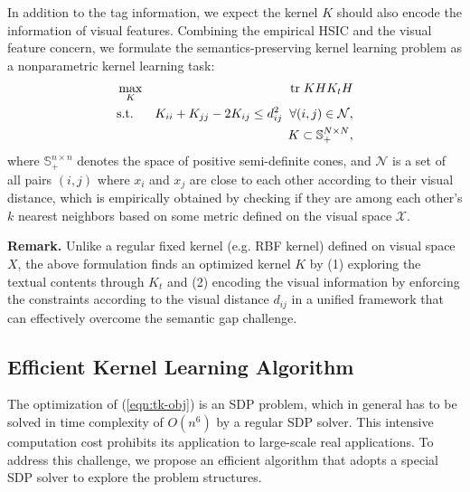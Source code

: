 In addition to the tag information, we expect the kernel $K$ should also encode the information of visual features. Combining the empirical HSIC and the visual feature concern, we formulate the semantics-preserving kernel learning problem as a nonparametric kernel learning task:
\begin{eqnarray} \label{eqn:tk-obj}
&\max_{K}& \tr K H K_t H\\
&\mbox{s.t.}& K_{ii} + K_{jj} - 2K_{ij} \leq d^2_{ij}\;\;\forall (i, j) \in \mathcal N, \nonumber\\
&& K \subset \mathbb S^{N \times N}_+,\nonumber
\end{eqnarray}
where $\mathbb S^{n \times n}_+$ denotes the space of positive semi-definite cones,
and $\mathcal N$ is a set of all pairs $(i, j)$ where $x_i$ and $x_j$ are close to each
other according to their visual distance, which is empirically obtained by checking if
they are among each other's $k$ nearest neighbors based on some metric defined on
the visual space $\mathcal X$.

{\bf Remark.} Unlike a regular fixed kernel (e.g. RBF kernel) defined on visual space $X$, the above formulation finds an optimized kernel $K$ by (1) exploring the textual contents through $K_t$ and (2) encoding the visual information by enforcing the constraints according to the visual distance $d_{ij}$ in a unified framework that can effectively overcome the semantic gap challenge.

\subsection{Efficient Kernel Learning Algorithm}

The optimization of (\ref{eqn:tk-obj}) is an SDP problem, which in general has to be solved in time complexity of $O(n^6)$ by a regular SDP solver. This intensive computation cost prohibits its application to large-scale real applications. To address this challenge, we propose an efficient algorithm that adopts a special SDP solver to explore the problem structures.

